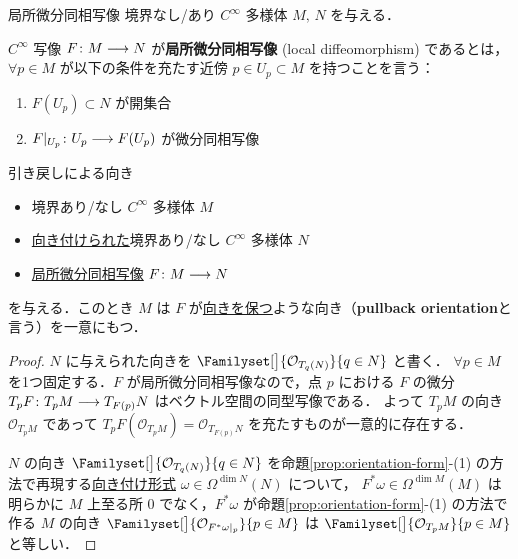 \documentclass[geometry_main]{subfiles}
\begin{document}
\begin{mydef}[label=def:loc-diffeo]{局所微分同相写像}
    境界なし/あり $C^\infty$ 多様体 $M,\, N$ を与える．
    
    $C^\infty$ 写像 $F \colon M \longrightarrow N$ が\textbf{局所微分同相写像} (local diffeomorphism) であるとは，
    $\forall p \in M$ が以下の条件を充たす近傍 $p \in U_p \subset M$ を持つことを言う：
    \begin{enumerate}
        \item $F(U_p) \subset N$ が開集合
        \item $F|_{U_p} \colon U_p \longrightarrow F(U_p)$ が微分同相写像
    \end{enumerate}
\end{mydef}

\begin{myprop}[label=prop:pullback-orientation]{引き戻しによる向き}
	\begin{itemize}
		\item 境界あり/なし $C^\infty$ 多様体 $M$ 
		\item \hyperref[def:smooth-orientation]{向き付けられた}境界あり/なし $C^\infty$ 多様体 $N$
		\item \hyperref[def:loc-diffeo]{局所微分同相写像} $F \colon M \longrightarrow N$
	\end{itemize}
	を与える．このとき $M$ は $F$ が\hyperref[def:orientation-preserving]{向きを保つ}ような向き（\textbf{pullback orientation}と言う）を一意にもつ．
\end{myprop}

\begin{proof}
	$N$ に与えられた向きを $\Familyset[\big]{\mathcal{O}_{T_q(N)}}{q \in N}$ と書く．
	$\forall p \in M$ を1つ固定する．$F$ が局所微分同相写像なので，点 $p$ における $F$ の微分 $T_p F \colon T_p M \longrightarrow T_{F(p)} N$ はベクトル空間の同型写像である．
	よって $T_p M$ の向き $\mathcal{O}_{T_p M}$ であって $T_p F (\mathcal{O}_{T_p M}) = \mathcal{O}_{T_{F(p)} N}$ を充たすものが一意的に存在する．

	$N$ の向き $\Familyset[\big]{\mathcal{O}_{T_q(N)}}{q \in N}$ を命題\ref{prop:orientation-form}-(1) の方法で再現する\hyperref[def:orientation-form]{向き付け形式} $\omega \in \Omega^{\dim N}(N)$ について，
	$F^* \omega \in \Omega^{\dim M}(M)$ は明らかに $M$ 上至る所 $0$ でなく，$F^* \omega$ が命題\ref{prop:orientation-form}-(1) の方法で作る $M$ の向き $\Familyset[\big]{\mathcal{O}_{F^* \omega|_p}}{p \in M}$ は $\Familyset[\big]{\mathcal{O}_{T_p M}}{p \in M}$ と等しい．
\end{proof}
\end{document}

